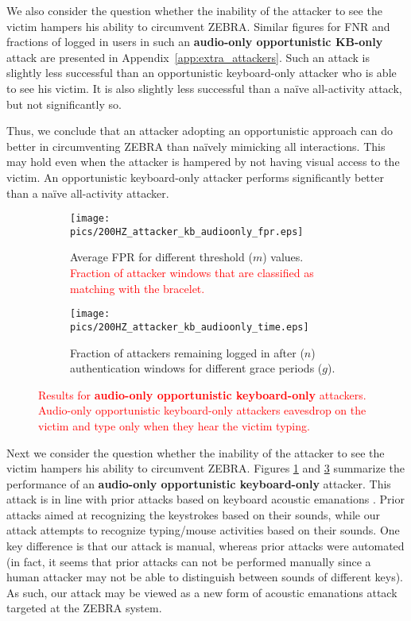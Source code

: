 \documentclass[conference]{IEEEtran}
\newcommand{\zebra}{ZEBRA\xspace}
\newcommand{\KBactivity}{keyboard-only\xspace}
\newcommand{\allactivity}{all-activity\xspace}
\newif\ifllncs
\newcommand\changeMika[1]{\textcolor{red}{#1}}
\newcommand\changeMika[1]{{#1}}
\newcommand{\figwidth}{\columnwidth}
\begin{document}
\ifllncs

We also consider the question whether the inability of the attacker to see the victim hampers his ability to circumvent \zebra. Similar figures for FNR and fractions of logged in users in such an \textbf{audio-only opportunistic KB-only} attack are presented in Appendix~\ref{app:extra_attackers}. 
Such an attack is slightly less successful than an opportunistic \KBactivity attacker who is able to see his victim. 
It is also slightly less successful than a na\"ive \allactivity attack, but not significantly so.

Thus, we conclude that an attacker adopting an opportunistic approach can do better in circumventing \zebra than na\"ively mimicking all interactions. This may hold even when the attacker is hampered by not having visual access to the victim. An opportunistic \KBactivity attacker performs significantly better than a na\"ive \allactivity attacker.

\else

\begin{figure}[t!]
	\centering
	\begin{subfigure}[b]{\figwidth}
		\centering
		\texttt{[image: pics/200HZ\_attacker\_kb\_audioonly\_fpr.eps]}
		\caption{Average FPR for different threshold ($m$) values. \changeMika{Fraction of attacker windows that are classified as matching with the bracelet.}}
		\label{fig:kb_audioonly_fpr}
	\end{subfigure}

	\begin{subfigure}[b]{\figwidth}
		\centering
		\texttt{[image: pics/200HZ\_attacker\_kb\_audioonly\_time.eps]}
		\caption{Fraction of attackers remaining logged in
                  after ($n$) authentication windows for different grace periods ($g$).}
		\label{fig:kb_audioonly_time}
	\end{subfigure}
\caption{\changeMika{Results for \textbf{audio-only opportunistic \KBactivity} attackers. Audio-only opportunistic \KBactivity attackers eavesdrop on the victim and type only when they hear the victim typing.}}
\end{figure}


Next we consider the question whether the inability of the attacker to see the victim hampers his ability to circumvent \zebra. Figures \ref{fig:kb_audioonly_fpr} and \ref{fig:kb_audioonly_time} summarize the performance of an
\textbf{audio-only opportunistic \KBactivity} attacker. 
This attack is in line with prior attacks based on keyboard acoustic emanations \cite{Asonov04, Zhuang2009KAE}.
Prior attacks aimed at recognizing the keystrokes based on their sounds, while our attack attempts to recognize typing/mouse activities based on their sounds. One key difference is that our attack is manual, whereas prior attacks were automated (in fact, it seems that prior attacks can not be performed manually since a human attacker may not be able to distinguish between sounds of different keys). As such, our attack may be viewed as a new form of acoustic emanations attack targeted at the ZEBRA system.
\end{document}
